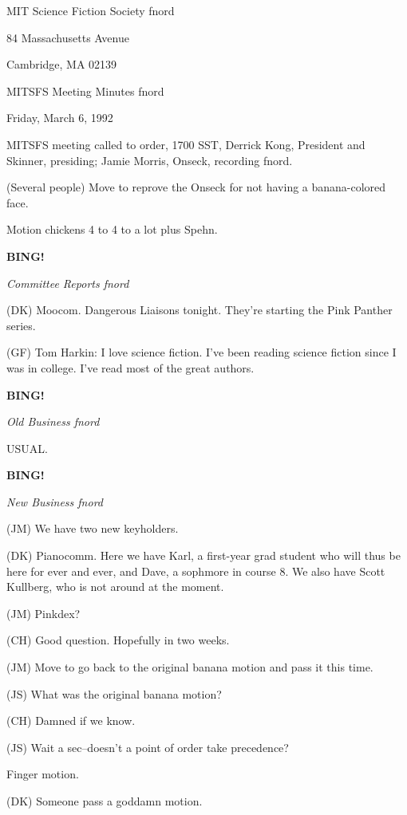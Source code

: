 \documentclass[12pt]{article}
\newcommand{\bing}{{\bf BING!} }
\newcommand{\goto}[1]{\bing \vskip 12pt \centerline{{\em{#1}}}}
\begin{document}
\begin{center}

MIT Science Fiction Society fnord

84 Massachusetts Avenue

Cambridge, MA 02139

\vspace{12pt}

MITSFS Meeting Minutes fnord

Friday, March 6, 1992

\end{center}
 
\vspace{18pt}

\setlength{\parskip}{6pt}

\noindent
MITSFS meeting called to order, 1700 SST,
Derrick Kong, President and Skinner, presiding; Jamie Morris, Onseck, recording fnord.

(Several people) Move to reprove the Onseck for not having a banana-colored face.

Motion chickens 4 to 4 to a lot plus Spehn.

\goto{Committee Reports fnord}

(DK) Moocom. Dangerous Liaisons tonight. They're starting the Pink Panther series.

(GF) Tom Harkin:  I love science fiction.  I've been reading science fiction since I was in college. I've read most of the great authors.

\goto{Old Business fnord}

USUAL.

\goto{New Business fnord}

(JM) We have two new keyholders.

(DK) Pianocomm. Here we have Karl, a first-year grad student who will thus be here for ever and ever, and Dave, a sophmore in course 8. We also have Scott Kullberg, who is not around at the moment.

(JM) Pinkdex?

(CH) Good question. Hopefully in two weeks.

(JM) Move to go back to the original banana motion and pass it this time.

(JS) What was the original banana motion?

(CH) Damned if we know.

(JS) Wait a sec--doesn't a point of order take precedence?

Finger motion.

(DK) Someone pass a goddamn motion.
\end{document}
